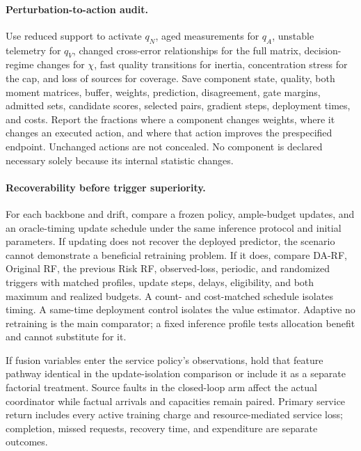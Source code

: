 \documentclass[10pt]{article}
\begin{document}
\paragraph{Perturbation-to-action audit.}
Use reduced support to activate $q_N$, aged measurements for $q_A$, unstable
telemetry for $q_V$, changed cross-error relationships for the full matrix,
decision-regime changes for $\chi$, fast quality transitions for inertia,
concentration stress for the cap, and loss of sources for coverage. Save
component state, quality, both moment matrices, buffer, weights, prediction,
disagreement, gate margins, admitted sets, candidate scores, selected pairs,
gradient steps, deployment times, and costs. Report the fractions where a
component changes weights, where it changes an executed action, and where that
action improves the prespecified endpoint. Unchanged actions are not concealed.
No component is declared necessary solely because its internal statistic changes.

\paragraph{Recoverability before trigger superiority.}
For each backbone and drift, compare a frozen policy, ample-budget updates,
and an oracle-timing update schedule under the same inference protocol and
initial parameters. If updating does not recover the deployed predictor,
the scenario cannot demonstrate a beneficial retraining problem. If it does,
compare DA-RF, Original RF, the previous Risk RF, observed-loss, periodic,
and randomized triggers with matched profiles, update steps, delays, eligibility,
and both maximum and realized budgets. A count- and cost-matched schedule
isolates timing. A same-time deployment control isolates the value estimator.
Adaptive no retraining is the main comparator; a fixed inference profile tests
allocation benefit and cannot substitute for it.

If fusion variables enter the service policy's observations, hold that feature
pathway identical in the update-isolation comparison or include it as a separate
factorial treatment. Source faults in the closed-loop arm affect the actual
coordinator while factual arrivals and capacities remain paired. Primary service
return includes every active training charge and resource-mediated service loss;
completion, missed requests, recovery time, and expenditure are separate outcomes.
\end{document}
